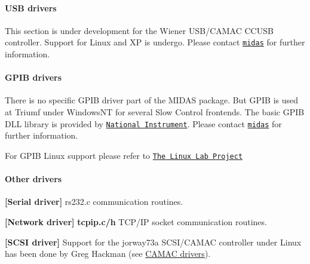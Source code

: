 \label{FE_Hardware_idx_Hardware_drivers_USB}
\hypertarget{FE_Hardware_idx_Hardware_drivers_USB}{}
 

 \hypertarget{FE_Hardware_USB_drivers}{}\paragraph{USB drivers}\label{FE_Hardware_USB_drivers}
This section is under development for the Wiener USB/CAMAC CCUSB controller. Support for Linux and XP is undergo. Please contact \href{mailto:midas@psi.ch, midas@triumf.ca?subject=USB driver}{\tt midas} for further information.

\label{FE_Hardware_idx_Hardware_drivers_GPIB}
\hypertarget{FE_Hardware_idx_Hardware_drivers_GPIB}{}
 

 \hypertarget{FE_Hardware_GPIB_drivers}{}\paragraph{GPIB drivers}\label{FE_Hardware_GPIB_drivers}
There is no specific GPIB driver part of the MIDAS package. But GPIB is used at Triumf under WindowsNT for several Slow Control frontends. The basic GPIB DLL library is provided by \href{http://www.ni.com/default.htm}{\tt National Instrument}. Please contact \href{mailto:midas@triumf.ca?subject=GPIB driver}{\tt midas} for further information.

For GPIB Linux support please refer to \href{http://www.llp.fu-berlin.de/pool/software/busses/}{\tt The Linux Lab Project}

\label{FE_Hardware_idx_Hardware_drivers_other}
\hypertarget{FE_Hardware_idx_Hardware_drivers_other}{}
 

 \hypertarget{FE_Hardware_Other_drivers}{}\paragraph{Other drivers}\label{FE_Hardware_Other_drivers}

\begin{DoxyItemize}
\item {\bfseries \mbox{[}Serial driver\mbox{]}} rs232.c communication routines.
\item {\bfseries \mbox{[}Network driver\mbox{]}} {\bfseries tcpip.c/h} TCP/IP socket communication routines.
\item {\bfseries \mbox{[}SCSI driver\mbox{]}} Support for the jorway73a SCSI/CAMAC controller under Linux has been done by Greg Hackman (see \hyperlink{FE_Hardware_CAMAC_drivers}{CAMAC drivers}).
\end{DoxyItemize}

